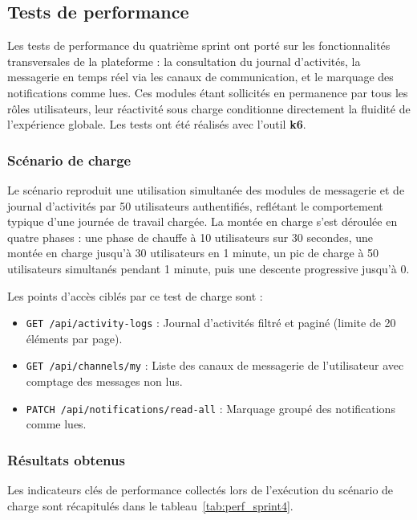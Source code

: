 \subsection{Tests de performance}
\label{sec:tests_performance_sprint4}

Les tests de performance du quatrième sprint ont porté sur les
fonctionnalités transversales de la plateforme : la consultation du
journal d'activités, la messagerie en temps réel via les canaux de
communication, et le marquage des notifications comme lues. Ces modules
étant sollicités en permanence par tous les rôles utilisateurs, leur
réactivité sous charge conditionne directement la fluidité de l'expérience
globale. Les tests ont été réalisés avec l'outil \textbf{k6}.

\subsubsection{Scénario de charge}

Le scénario reproduit une utilisation simultanée des modules de messagerie
et de journal d'activités par 50 utilisateurs authentifiés, reflétant le
comportement typique d'une journée de travail chargée. La montée en charge
s'est déroulée en quatre phases : une phase de chauffe à 10 utilisateurs
sur 30 secondes, une montée en charge jusqu'à 30 utilisateurs en 1 minute,
un pic de charge à 50 utilisateurs simultanés pendant 1 minute, puis une
descente progressive jusqu'à 0.

Les points d'accès ciblés par ce test de charge sont :
\begin{itemize}
    \item \texttt{GET /api/activity-logs} : Journal d'activités filtré et
          paginé (limite de 20 éléments par page).
    \item \texttt{GET /api/channels/my} : Liste des canaux de messagerie
          de l'utilisateur avec comptage des messages non lus.
    \item \texttt{PATCH /api/notifications/read-all} : Marquage groupé
          des notifications comme lues.
\end{itemize}

\subsubsection{Résultats obtenus}
Les indicateurs clés de performance collectés lors de l'exécution du scénario de charge sont récapitulés dans le tableau~\ref{tab:perf_sprint4}.

